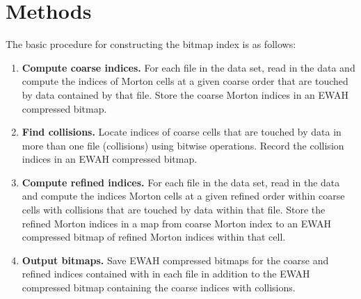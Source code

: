 \documentclass[apjl]{emulateapj}
\begin{document}
\section{Methods}\label{S:methods}
The basic procedure for constructing the bitmap index is as follows:
\begin{enumerate}
\item {\bf Compute coarse indices.} For each file in the data set, read in the data and compute the indices of Morton cells at a given coarse order that are touched by data contained by that file. Store the coarse Morton indices in an EWAH compressed bitmap.
\item {\bf Find collisions.} Locate indices of coarse cells that are touched by data in more than one file (collisions) using bitwise operations. Record the collision indices in an EWAH compressed bitmap.
\item {\bf Compute refined indices.} For each file in the data set, read in the data and compute the indices Morton cells at a given refined order within coarse cells with collisions that are touched by data within that file. Store the refined Morton indices in a map from coarse Morton index to an EWAH compressed bitmap of refined Morton indices within that cell.
\item {\bf Output bitmaps.} Save EWAH compressed bitmaps for the coarse and refined indices contained with in each file in addition to the EWAH compressed bitmap containing the coarse indices with collisions.
\end{enumerate}
\end{document}
